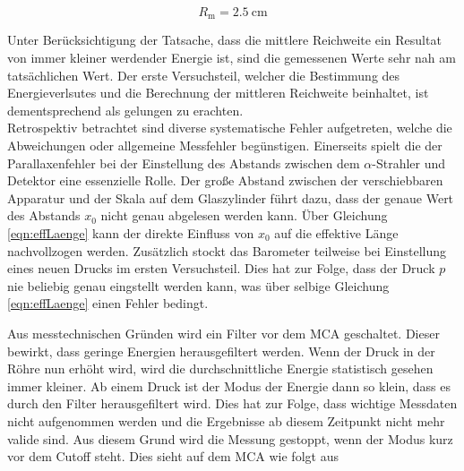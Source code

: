 \begin{equation*}
    R_\text{m} = \qty{2.5}{\centi\meter}
\end{equation*}

\noindent Unter Berücksichtigung der Tatsache, dass die mittlere Reichweite ein Resultat von immer kleiner werdender Energie
ist, sind die gemessenen Werte sehr nah am tatsächlichen Wert. Der erste Versuchsteil, welcher die Bestimmung des Energieverlsutes
und die Berechnung der mittleren Reichweite beinhaltet, ist dementsprechend als gelungen zu erachten.\\

\noindent Retrospektiv betrachtet sind diverse systematische Fehler aufgetreten, welche die Abweichungen oder allgemeine Messfehler 
begünstigen. Einerseits spielt die der Parallaxenfehler bei der Einstellung des Abstands zwischen dem $\alpha$-Strahler und 
Detektor eine essenzielle Rolle. Der große Abstand zwischen der verschiebbaren Apparatur und der Skala auf dem Glaszylinder 
führt dazu, dass der genaue Wert des Abstands $x_0$ nicht genau abgelesen werden kann. Über Gleichung \eqref{eqn:effLaenge}
kann der direkte Einfluss von $x_0$ auf die effektive Länge nachvollzogen werden. Zusätzlich stockt das Barometer teilweise 
bei Einstellung eines neuen Drucks im ersten Versuchsteil. Dies hat zur Folge, dass der Druck $p$ nie beliebig genau eingstellt
werden kann, was über selbige Gleichung \eqref{eqn:effLaenge} einen Fehler bedingt. 


\noindent Aus messtechnischen Gründen wird ein Filter vor dem MCA geschaltet. Dieser bewirkt, dass geringe Energien 
herausgefiltert werden. Wenn der Druck in der Röhre nun erhöht wird, wird die durchschnittliche Energie statistisch 
gesehen immer kleiner. Ab einem Druck ist der Modus der Energie dann so klein, dass es durch den Filter herausgefiltert 
wird. Dies hat zur Folge, dass wichtige Messdaten nicht aufgenommen werden und die Ergebnisse ab diesem Zeitpunkt nicht 
mehr valide sind. Aus diesem Grund wird die Messung gestoppt, wenn der Modus kurz vor dem Cutoff steht. Dies sieht auf 
dem MCA wie folgt aus

